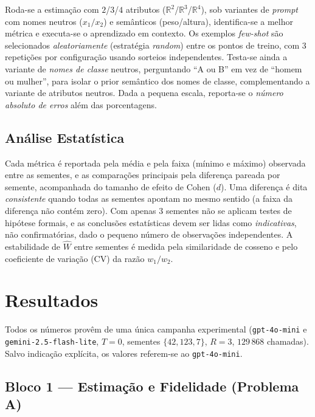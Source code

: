 \documentclass[12pt,a4paper]{article}
\newcommand{\West}{\ensuremath{\hat{W}}}   %
\begin{document}
Roda-se a
estimação com $2$/$3$/$4$ atributos ($\mathbb{R}^2$/$\mathbb{R}^3$/$\mathbb{R}^4$), sob
variantes de \emph{prompt} com
nomes neutros ($x_1/x_2$) e semânticos (peso/altura), identifica-se a melhor métrica e
executa-se o aprendizado em contexto. Os exemplos \emph{few-shot} são selecionados
\emph{aleatoriamente} (estratégia \emph{random}) entre os pontos de treino, com $3$
repetições por configuração usando sorteios independentes. Testa-se ainda a variante de
\emph{nomes de
classe} neutros, perguntando ``A ou B'' em vez de ``homem ou mulher'', para isolar o
prior semântico dos nomes de classe, complementando a variante de atributos
neutros. Dada a pequena escala, reporta-se o \emph{número absoluto de erros} além
das porcentagens.

\subsection{Análise Estatística}

Cada métrica é reportada pela média e pela faixa (mínimo e máximo) observada entre as
sementes, e as comparações principais pela diferença pareada por semente, acompanhada
do tamanho de efeito de Cohen ($d$). Uma diferença é dita \emph{consistente} quando
todas as sementes apontam no mesmo sentido (a faixa da diferença não contém zero). Com
apenas $3$ sementes não se aplicam testes de hipótese formais, e as conclusões
estatísticas devem ser lidas como \emph{indicativas}, não confirmatórias, dado o
pequeno número de observações independentes. A estabilidade de \West{} entre sementes é medida pela
similaridade de cosseno e pelo coeficiente de variação (CV) da razão $w_1/w_2$.

\section{Resultados}
\label{sec:resultados}

Todos os números provêm de uma única campanha experimental
(\texttt{gpt-4o-mini} e \texttt{gemini-2.5-flash-lite}, $T=0$, sementes $\{42,123,7\}$,
$R=3$, $129\,868$ chamadas). Salvo indicação explícita, os valores referem-se ao
\texttt{gpt-4o-mini}.

\subsection{Bloco 1 — Estimação e Fidelidade (Problema A)}
\end{document}
